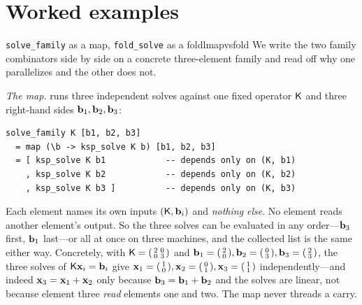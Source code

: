 \section{Worked examples}

\begin{workedexample}{\texttt{solve\_family} as a map, \texttt{fold\_solve} as a foldl}{mapvsfold}
We write the two family combinators side by side on a concrete three-element
family and read off why one parallelizes and the other does not.

\emph{The map.}  runs three independent solves against one
fixed operator $\mathsf{K}$ and three right-hand sides $\mathbf{b}_1, \mathbf{b}_2, \mathbf{b}_3$:
\begin{lstlisting}[style=l4style]
solve_family K [b1, b2, b3]
  = map (\b -> ksp_solve K b) [b1, b2, b3]
  = [ ksp_solve K b1            -- depends only on (K, b1)
    , ksp_solve K b2            -- depends only on (K, b2)
    , ksp_solve K b3 ]          -- depends only on (K, b3)
\end{lstlisting}
Each element names its own inputs $(\mathsf{K}, \mathbf{b}_i)$ and \emph{nothing else}. No
element reads another element's output. So the three solves can be evaluated in any
order---$\mathbf{b}_3$ first, $\mathbf{b}_1$ last---or all at once on three machines, and the
collected list is the same either way. Concretely, with
$\mathsf{K} = \begin{psmallmatrix}2&0\\0&3\end{psmallmatrix}$ and
$\mathbf{b}_1=\begin{psmallmatrix}2\\0\end{psmallmatrix},
\mathbf{b}_2=\begin{psmallmatrix}0\\3\end{psmallmatrix},
\mathbf{b}_3=\begin{psmallmatrix}2\\3\end{psmallmatrix}$, the three solves of
$\mathsf{K}\mathbf{x}_i=\mathbf{b}_i$ give $\mathbf{x}_1=\begin{psmallmatrix}1\\0\end{psmallmatrix},
\mathbf{x}_2=\begin{psmallmatrix}0\\1\end{psmallmatrix},
\mathbf{x}_3=\begin{psmallmatrix}1\\1\end{psmallmatrix}$ independently---and indeed
$\mathbf{x}_3 = \mathbf{x}_1 + \mathbf{x}_2$ only because $\mathbf{b}_3 = \mathbf{b}_1 + \mathbf{b}_2$ and the solves are
linear, not because element three \emph{read} elements one and two. The map never
threads a carry.


\end{workedexample}
